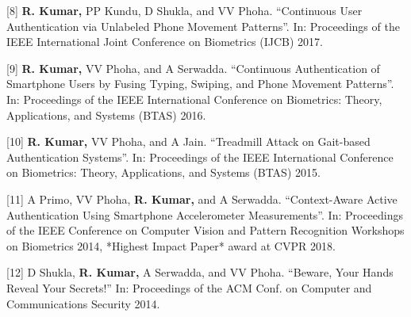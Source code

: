 \hspace{-0.5in}[8] \textbf{R. Kumar,} PP Kundu, D Shukla, and VV Phoha. “Continuous User Authentication via Unlabeled Phone Movement Patterns”. In: Proceedings of the IEEE International Joint Conference on Biometrics (IJCB) 2017.

\hspace{-0.5in}[9] \textbf{R. Kumar,} VV Phoha, and A Serwadda. “Continuous Authentication of Smartphone Users by Fusing Typing, Swiping, and Phone Movement Patterns”. In: Proceedings of the IEEE International Conference on Biometrics: Theory, Applications, and Systems (BTAS) 2016.

\hspace{-0.5in}[10] \textbf{R. Kumar,} VV Phoha, and A Jain. “Treadmill Attack on Gait-based Authentication Systems”. In: Proceedings of the IEEE International Conference on Biometrics: Theory, Applications, and Systems (BTAS) 2015.

\hspace{-0.5in}[11] A Primo, VV Phoha, \textbf{R. Kumar,} and A Serwadda. “Context-Aware Active Authentication Using Smartphone Accelerometer Measurements”. In: Proceedings of the IEEE Conference on Computer Vision and Pattern Recognition Workshops on Biometrics 2014, *Highest Impact Paper* award at CVPR 2018.

\hspace{-0.5in}[12] D Shukla, \textbf{R. Kumar,} A Serwadda, and VV Phoha. “Beware, Your Hands Reveal Your Secrets!” In: Proceedings of the ACM Conf. on Computer and Communications Security 2014.

